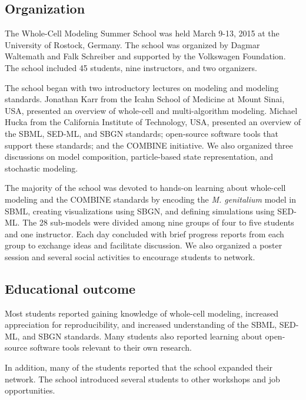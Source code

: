 \documentclass[journal,transmag]{IEEEtran}
\begin{document}
\subsection{Organization}
The Whole-Cell Modeling Summer School was held March 9-13, 2015 at the University of Rostock, Germany. The school was organized by Dagmar Waltemath and Falk Schreiber and supported by the Volkswagen Foundation. The school included 45 students, nine instructors, and two organizers.

The school began with two introductory lectures on modeling and modeling standards. Jonathan Karr from the Icahn School of Medicine at Mount Sinai, USA, presented an overview of whole-cell and multi-algorithm modeling. Michael Hucka from the California Institute of Technology, USA, presented an overview of the SBML, SED-ML, and SBGN standards; open-source software tools that support these standards; and the COMBINE initiative. We also organized three discussions on model composition, particle-based state representation, and stochastic modeling. 

The majority of the school was devoted to hands-on learning about whole-cell modeling and the COMBINE standards by encoding the \textit{M. genitalium} model in SBML, creating visualizations using SBGN, and defining simulations using SED-ML. The 28 sub-models were divided among nine groups of four to five students and one instructor.
Each day concluded with brief progress reports from each group to exchange ideas and facilitate discussion.
We also organized a poster session and several social activities to encourage students to network.

\subsection{Educational outcome}
Most students reported gaining knowledge of whole-cell modeling, increased appreciation for reproducibility, and increased understanding of the SBML, SED-ML, and SBGN standards. Many students also reported learning about open-source software tools relevant to their own research.

In addition, many of the students reported that the school expanded their network. The school introduced several students to other workshops and job opportunities.
\end{document}
